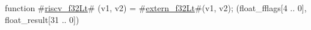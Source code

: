 function #\hyperref[sailRISCVzriscvzyf32Lt]{riscv\_f32Lt}# (v1, v2) = {
  #\hyperref[sailRISCVzexternzyf32Lt]{extern\_f32Lt}#(v1, v2);
  (float_fflags[4 .. 0], float_result[31 .. 0])
}
